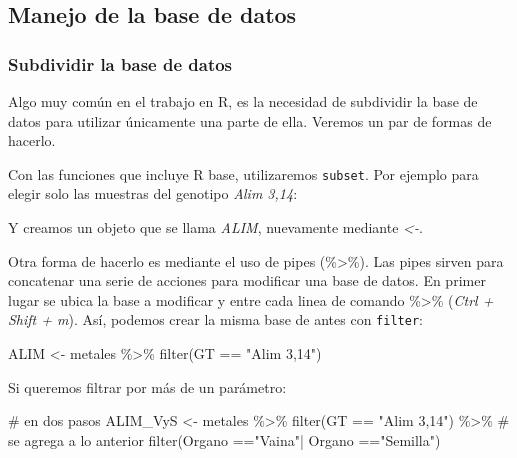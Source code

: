 \documentclass[
  letterpaper,
  DIV=11,
  numbers=noendperiod]{scrartcl}
\newenvironment{Shaded}{\begin{snugshade}}{\end{snugshade}}
\newcommand{\CommentTok}[1]{\textcolor[rgb]{0.37,0.37,0.37}{#1}}
\newcommand{\FunctionTok}[1]{\textcolor[rgb]{0.28,0.35,0.67}{#1}}
\newcommand{\NormalTok}[1]{\textcolor[rgb]{0.00,0.23,0.31}{#1}}
\newcommand{\OtherTok}[1]{\textcolor[rgb]{0.00,0.23,0.31}{#1}}
\newcommand{\SpecialCharTok}[1]{\textcolor[rgb]{0.37,0.37,0.37}{#1}}
\newcommand{\StringTok}[1]{\textcolor[rgb]{0.13,0.47,0.30}{#1}}
\begin{document}
\hypertarget{manejo-de-la-base-de-datos}{%
\subsection{Manejo de la base de
datos}\label{manejo-de-la-base-de-datos}}

\hypertarget{subdividir-la-base-de-datos}{%
\subsubsection{Subdividir la base de
datos}\label{subdividir-la-base-de-datos}}

Algo muy común en el trabajo en R, es la necesidad de subdividir la base
de datos para utilizar únicamente una parte de ella. Veremos un par de
formas de hacerlo.

Con las funciones que incluye R base, utilizaremos \texttt{subset}. Por
ejemplo para elegir solo las muestras del genotipo \emph{Alim 3,14}:

\begin{Shaded}
\end{Shaded}

Y creamos un objeto que se llama \emph{ALIM}, nuevamente mediante
\emph{\textless-}.

Otra forma de hacerlo es mediante el uso de pipes (\%\textgreater\%).
Las pipes sirven para concatenar una serie de acciones para modificar
una base de datos. En primer lugar se ubica la base a modificar y entre
cada linea de comando \%\textgreater\% (\emph{Ctrl + Shift + m}). Así,
podemos crear la misma base de antes con \texttt{filter}:

\begin{Shaded}
\begin{Highlighting}[]
\NormalTok{ALIM }\OtherTok{\textless{}{-}}\NormalTok{ metales }\SpecialCharTok{\%\textgreater{}\%} \FunctionTok{filter}\NormalTok{(GT }\SpecialCharTok{==} \StringTok{"Alim 3,14"}\NormalTok{)}
\end{Highlighting}
\end{Shaded}

Si queremos filtrar por más de un parámetro:

\begin{Shaded}
\begin{Highlighting}[]
\CommentTok{\# en dos pasos}
\NormalTok{ALIM\_VyS }\OtherTok{\textless{}{-}}\NormalTok{ metales }\SpecialCharTok{\%\textgreater{}\%}
                    \FunctionTok{filter}\NormalTok{(GT }\SpecialCharTok{==} \StringTok{"Alim 3,14"}\NormalTok{) }\SpecialCharTok{\%\textgreater{}\%} \CommentTok{\# se agrega a lo anterior}
                    \FunctionTok{filter}\NormalTok{(Organo }\SpecialCharTok{==}\StringTok{"Vaina"}\SpecialCharTok{|}\NormalTok{ Organo }\SpecialCharTok{==}\StringTok{"Semilla"}\NormalTok{)}
\end{Highlighting}
\end{Shaded}
\end{document}
